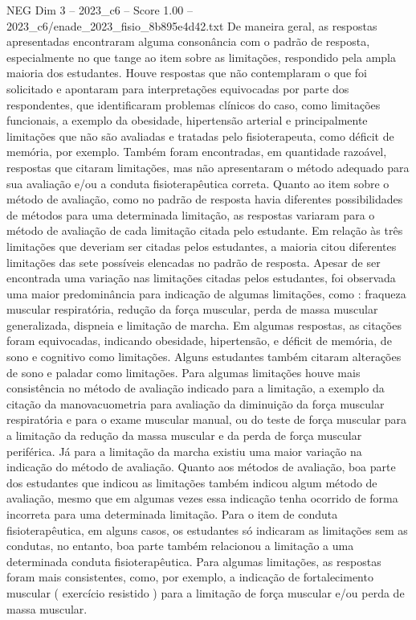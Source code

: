 \begin{textsample}{NEG Dim 3 – 2023\_c6 – Score 1.00 – 2023\_c6/enade\_2023\_fisio\_8b895e4d42.txt}
De maneira geral, as respostas apresentadas encontraram alguma consonância com o padrão de resposta, especialmente no que tange ao item sobre as limitações, respondido pela ampla maioria dos estudantes.
Houve respostas que não contemplaram o que foi solicitado e apontaram para interpretações equivocadas por parte dos respondentes, que identificaram problemas clínicos do caso, como limitações funcionais, a exemplo da obesidade, hipertensão arterial e principalmente limitações que não são avaliadas e tratadas pelo fisioterapeuta, como déficit de memória, por exemplo.
Também foram encontradas, em quantidade razoável, respostas que citaram limitações, mas não apresentaram o método adequado para sua avaliação e/ou a conduta fisioterapêutica correta.
Quanto ao item sobre o método de avaliação, como no padrão de resposta havia diferentes possibilidades de métodos para uma determinada limitação, as respostas variaram para o método de avaliação de cada limitação citada pelo estudante.
Em relação às três limitações que deveriam ser citadas pelos estudantes, a maioria citou diferentes limitações das sete possíveis elencadas no padrão de resposta.
Apesar de ser encontrada uma variação nas limitações citadas pelos estudantes, foi observada uma maior predominância para indicação de algumas limitações, como : fraqueza muscular respiratória, redução da força muscular, perda de massa muscular generalizada, dispneia e limitação de marcha.
Em algumas respostas, as citações foram equivocadas, indicando obesidade, hipertensão, e déficit de memória, de sono e cognitivo como limitações.
Alguns estudantes também citaram alterações de sono e paladar como limitações.
Para algumas limitações houve mais consistência no método de avaliação indicado para a limitação, a exemplo da citação da manovacuometria para avaliação da diminuição da força muscular respiratória e para o exame muscular manual, ou do teste de força muscular para a limitação da redução da massa muscular e da perda de força muscular periférica.
Já para a limitação da marcha existiu uma maior variação na indicação do método de avaliação.
Quanto aos métodos de avaliação, boa parte dos estudantes que indicou as limitações também indicou algum método de avaliação, mesmo que em algumas vezes essa indicação tenha ocorrido de forma incorreta para uma determinada limitação.
Para o item de conduta fisioterapêutica, em alguns casos, os estudantes só indicaram as limitações sem as condutas, no entanto, boa parte também relacionou a limitação a uma determinada conduta fisioterapêutica.
Para algumas limitações, as respostas foram mais consistentes, como, por exemplo, a indicação de fortalecimento muscular ( exercício resistido ) para a limitação de força muscular e/ou perda de massa muscular.

\end{textsample}
